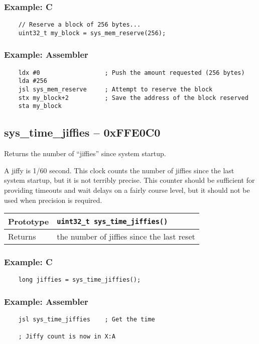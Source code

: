 \subsubsection*{Example: C}
\begin{lstlisting}
    // Reserve a block of 256 bytes...
    uint32_t my_block = sys_mem_reserve(256);    
\end{lstlisting}

\subsubsection*{Example: Assembler}
\begin{verbatim}
    ldx #0                  ; Push the amount requested (256 bytes)
    lda #256
    jsl sys_mem_reserve     ; Attempt to reserve the block
    stx my_block+2          ; Save the address of the block reserved
    sta my_block
\end{verbatim}

\subsection*{sys\_time\_jiffies -- 0xFFE0C0}
Returns the number of “jiffies” since system startup.

A jiffy is 1/60 second. This clock counts the number of jiffies since the last system startup, but it is not terribly precise. This counter should be sufficient for providing timeouts and wait delays on a fairly course level, but it should not be used when precision is required.

\bigskip

\begin{tabular}{|l||l|} \hline
Prototype & \lstinline!uint32_t sys_time_jiffies()! \\ \hline
Returns & the number of jiffies since the last reset \\ \hline
\end{tabular}

\subsubsection*{Example: C}
\begin{lstlisting}
    long jiffies = sys_time_jiffies();
\end{lstlisting}

\subsubsection*{Example: Assembler}
\begin{verbatim}
    jsl sys_time_jiffies    ; Get the time

    ; Jiffy count is now in X:A
\end{verbatim}

